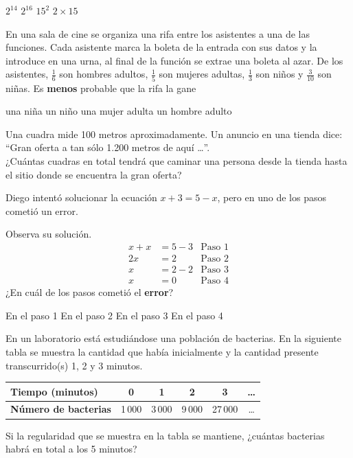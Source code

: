 \documentclass[10pt,letterpaper,addpoints]{exam}
\begin{document}
\begin{questions}
\begin{oneparchoices}
\CorrectChoice $2^{14}$
\choice $2^{16}$
\choice $15^{2}$
\choice $2\times 15$
\end{oneparchoices}
\question En una sala de cine se organiza una rifa entre los asistentes a una de las funciones. Cada asistente marca la boleta de la entrada con sus datos y la introduce en una urna, al final de la función se extrae una boleta al azar. De los asistentes, $\frac{1}{6}$ son hombres adultos, $\frac{1}{5}$ son mujeres adultas, $\frac{1}{3}$ son niños y  $\frac{3}{10}$     son niñas. Es \textbf{menos} probable que la rifa la gane

\begin{oneparchoices}
\choice una niña
\choice un niño
\choice una mujer adulta
\CorrectChoice un hombre adulto
\end{oneparchoices}
\question Una cuadra mide 100 metros aproximadamente. Un anuncio en una tienda dice: “Gran oferta a tan sólo 1.200 metros de aquí \ldots ”.\\ 

¿Cuántas cuadras en total tendrá que caminar una persona desde la tienda hasta el sitio donde se encuentra la gran oferta?

\begin{oneparchoices}
\end{oneparchoices}
\question Diego intentó solucionar la ecuación $x + 3 = 5 - x$, pero en uno de los pasos cometió un error.

Observa su solución.
\begin{align*}
 x+x&=5-3 & \mbox{Paso 1}\\
 2x&=2 & \mbox{Paso 2}\\
  x&=2-2 & \mbox{Paso 3}\\
  x&=0 & \mbox{Paso 4}
\end{align*}
¿En cuál de los pasos cometió el \textbf{error}?

\begin{oneparchoices}
\choice En el paso 1
\choice En el paso 2
\CorrectChoice En el paso 3
\choice En el paso 4
\end{oneparchoices}
\question En un laboratorio está estudiándose una población de bacterias. En la siguiente tabla se muestra la cantidad que había inicialmente y la cantidad presente transcurrido(s) 1, 2 y 3 minutos.
\begin{center}
\begin{tabular}{|p{2.5cm}|c|c|c|c|c|}
\hline 
\textbf{Tiempo (minutos)} & \textbf{0} & \textbf{1} & \textbf{2} & \textbf{3} & \textbf{\ldots} \\ 
\hline 
\textbf{Número de bacterias} & 1\,000 & 3\,000 & 9\,000 & 27\,000 & \ldots \\ 
\hline 
\end{tabular} 
\end{center}
Si la regularidad que se muestra en la tabla se mantiene, ¿cuántas bacterias habrá en total a los 5 minutos?

\begin{oneparchoices}

\end{oneparchoices}
\end{questions}
\end{document}
